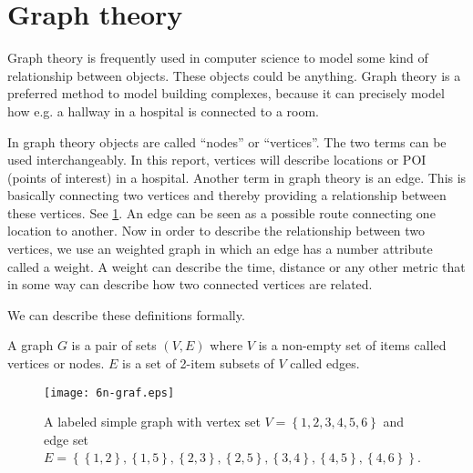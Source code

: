 \section{Graph theory}

Graph theory is frequently used in computer science to model some kind of relationship between objects. These objects could be anything. Graph theory is a preferred method to model building complexes, because it can precisely model how e.g. a hallway in a hospital is connected to a room.

In graph theory objects are called \enquote{nodes} or \enquote{vertices}. The two terms can be used interchangeably. In this report, vertices will describe locations or POI (points of interest) in a hospital. Another term in graph theory is an edge. This is basically connecting two vertices and thereby providing a relationship between these vertices. See \cref{fig:labeled_graph}. An edge can be seen as a possible route connecting one location to another. Now in order to describe the relationship between two vertices, we use an weighted graph in which an edge has a number attribute called a weight. A weight can describe the time, distance or any other metric that in some way can describe how two connected vertices are related\cite{wiki_graph_glos,MIT2012}.

We can describe these definitions formally.\cite{MIT2012}
\begin{mydef}
	A graph $G$ is a pair of sets $(V,E)$ where $V$ is a non-empty set of items called vertices or nodes. $E$ is a set of 2-item subsets of $V$ called edges.
\end{mydef}

\begin{figure}[ht!]
    \centering
    \texttt{[image: 6n-graf.eps]}
    \caption{A labeled simple graph with vertex set $V = \left\{ {1, 2, 3, 4, 5, 6} \right\} $ and edge set $E = \left\{ \left\{ {1,2}\right\}, \left\{ {1,5}\right\}, \left\{ {2,3}\right\}, \left\{ {2,5}\right\}, \left\{ {3,4}\right\}, \left\{ {4,5} \right\} , \left\{ {4,6} \right\} \right\}$. \cite{wiki_graph_glos}}
    \label{fig:labeled_graph}
  \end{figure}


